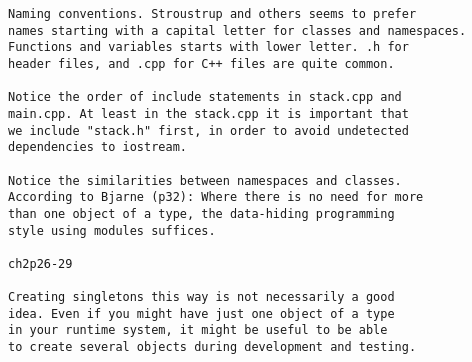 \documentclass[landscape]{slides}
\begin{document}
\begin{slide}
\begin{note}
\begin{tiny}
\begin{verbatim}
Naming conventions. Stroustrup and others seems to prefer
names starting with a capital letter for classes and namespaces.
Functions and variables starts with lower letter. .h for
header files, and .cpp for C++ files are quite common.

Notice the order of include statements in stack.cpp and
main.cpp. At least in the stack.cpp it is important that
we include "stack.h" first, in order to avoid undetected
dependencies to iostream.

Notice the similarities between namespaces and classes.
According to Bjarne (p32): Where there is no need for more
than one object of a type, the data-hiding programming
style using modules suffices.

ch2p26-29

Creating singletons this way is not necessarily a good
idea. Even if you might have just one object of a type
in your runtime system, it might be useful to be able
to create several objects during development and testing.
\end{verbatim}
\end{tiny}
\end{note}  

\end{slide}

\end{document}
